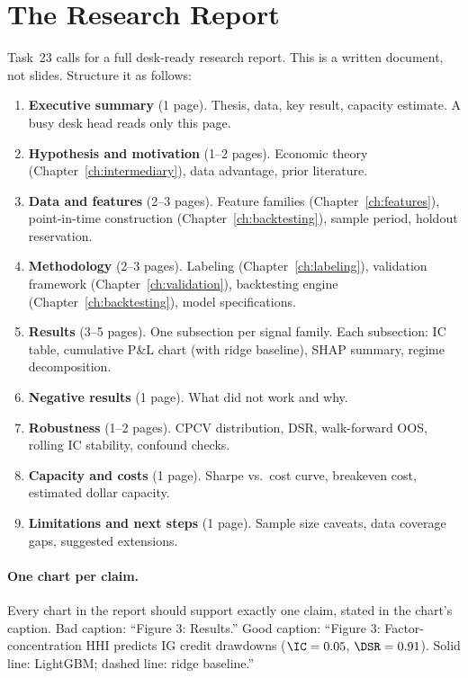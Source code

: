 \section{The Research Report}
\label{sec:presenting:report}

Task~23 calls for a full desk-ready research report.  This is a written
document, not slides.  Structure it as follows:

\begin{enumerate}[leftmargin=1.5em]
  \item \textbf{Executive summary} (1 page).  Thesis, data, key result,
    capacity estimate.  A busy desk head reads only this page.
  \item \textbf{Hypothesis and motivation} (1--2 pages).  Economic
    theory (Chapter~\ref{ch:intermediary}), data advantage, prior
    literature.
  \item \textbf{Data and features} (2--3 pages).  Feature families
    (Chapter~\ref{ch:features}), point-in-time construction
    (Chapter~\ref{ch:backtesting}), sample period, holdout reservation.
  \item \textbf{Methodology} (2--3 pages).  Labeling
    (Chapter~\ref{ch:labeling}), validation framework
    (Chapter~\ref{ch:validation}), backtesting engine
    (Chapter~\ref{ch:backtesting}), model specifications.
  \item \textbf{Results} (3--5 pages).  One subsection per signal family.
    Each subsection: IC table, cumulative P\&L chart (with ridge
    baseline), SHAP summary, regime decomposition.
  \item \textbf{Negative results} (1 page).  What did not work and why.
  \item \textbf{Robustness} (1--2 pages).  CPCV distribution, DSR,
    walk-forward OOS, rolling IC stability, confound checks.
  \item \textbf{Capacity and costs} (1 page).  Sharpe vs.\ cost curve,
    breakeven cost, estimated dollar capacity.
  \item \textbf{Limitations and next steps} (1 page).  Sample size
    caveats, data coverage gaps, suggested extensions.
\end{enumerate}

\paragraph{One chart per claim.}  Every chart in the report should
support exactly one claim, stated in the chart's caption.  Bad caption:
``Figure 3: Results.''  Good caption: ``Figure 3: Factor-concentration
HHI predicts IG credit drawdowns ($\IC = 0.05$, $\DSR = 0.91$).  Solid
line: LightGBM; dashed line: ridge baseline.''

